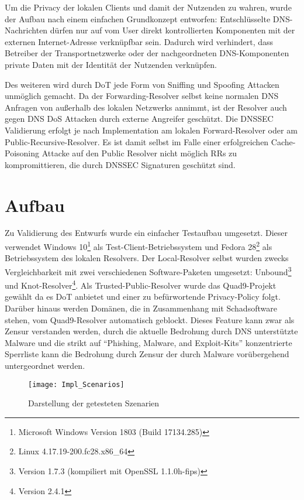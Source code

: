 Um die Privacy der lokalen Clients und damit der Nutzenden zu wahren, wurde der Aufbau nach einem einfachen Grundkonzept entworfen: Entschlüsselte DNS-Nachrichten dürfen nur auf vom User direkt kontrollierten Komponenten mit der externen Internet-Adresse verknüpfbar sein. Dadurch wird verhindert, dass Betreiber der Transportnetzwerke oder der nachgeordneten DNS-Komponenten private Daten mit der Identität der Nutzenden verknüpfen.

Des weiteren wird durch DoT jede Form von Sniffing und Spoofing Attacken unmöglich gemacht. Da der Forwarding-Resolver selbst keine normalen DNS Anfragen von außerhalb des lokalen Netzwerks annimmt, ist der Resolver auch gegen DNS DoS Attacken durch externe Angreifer geschützt. Die \ac{DNSSEC} Validierung erfolgt je nach Implementation am lokalen Forward-Resolver oder am Public-Recursive-Resolver. Es ist damit selbst im Falle einer erfolgreichen Cache-Poisoning Attacke auf den Public Resolver nicht möglich RRs zu kompromittieren, die durch \ac{DNSSEC} Signaturen geschützt sind.

\section{Aufbau}
\label{sec:architecture}
Zu Validierung des Entwurfs wurde ein einfacher Testaufbau umgesetzt. Dieser verwendet Windows 10\footnote{Microsoft Windows Version 1803 (Build 17134.285)} als Test-Client-Betriebssystem und Fedora 28\footnote{Linux 4.17.19-200.fc28.x86\_64} als Betriebssystem des lokalen Resolvers. Der Local-Resolver selbst wurden zwecks Vergleichbarkeit mit zwei verschiedenen Software-Paketen umgesetzt: Unbound\footnote{Version 1.7.3 (kompiliert mit OpenSSL 1.1.0h-fips)} und Knot-Resolver\footnote{Version 2.4.1}. Als Trusted-Public-Resolver wurde das Quad9-Projekt gewählt da es DoT anbietet und einer zu befürwortende Privacy-Policy\cite{Quad9Privacy} folgt. Darüber hinaus werden Domänen, die in Zusammenhang mit Schadsoftware stehen, vom Quad9-Resolver automatisch geblockt. Dieses Feature kann zwar als Zensur verstanden werden, durch die aktuelle Bedrohung durch DNS unterstützte Malware \cite{Alcoy2017} und die strikt auf ``Phishing, Malware, and Exploit-Kits'' konzentrierte Sperrliste\cite{Quad9FAQ} kann die Bedrohung durch Zensur der durch Malware vorübergehend untergeordnet werden.   
\begin{wrapfigure}{r}{0.5\textwidth}
    \begin{center}
    \texttt{[image: Impl\_Scenarios]}
    \end{center}
    \caption{Darstellung der getesteten Szenarien}
    \label{img:impl-scenarios}
\end{wrapfigure}

